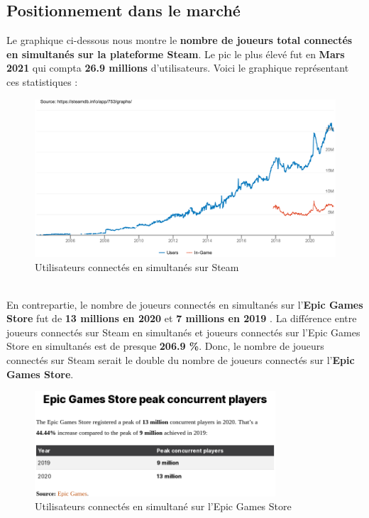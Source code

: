 \documentclass[12pt]{article}
\begin{document}
	\subsection{Positionnement dans le marché}
	Le graphique ci-dessous nous montre le \textbf{nombre de joueurs total connectés en simultanés sur la plateforme Steam}. Le pic le plus élevé fut en \textbf{Mars 2021} qui compta \textbf{26.9 millions} d'utilisateurs. Voici le graphique représentant ces statistiques \cite{steamdb_user_count}:
    \begin{figure}[ht]
		\centering
		\includegraphics[page=1, width=\textwidth, angle=0, clip, trim=0mm 0mm 0mm 10mm, scale=1.0]{chart.pdf}
		\caption{Utilisateurs connectés en simultanés sur Steam}
		\label{fig:diag_steam_players}
	\end{figure}\\
	En contrepartie, le nombre de joueurs connectés en simultanés sur l'\textbf{Epic Games Store} fut de \textbf{13 millions en 2020} et \textbf{7 millions en 2019} \cite{epicgames_user_count} \cite{backlink_epic_user_count}. La différence entre joueurs connectés sur Steam en simultanés et joueurs connectés sur l'Epic Games Store en simultanés est de presque \textbf{206.9 \%}. Donc, le nombre de joueurs connectés sur Steam serait le double du nombre de joueurs connectés sur l'\textbf{Epic Games Store}.
    \begin{figure}[ht]
        \centering
        \includegraphics[clip, trim=0mm 0mm 0mm 0mm, width=0.8\textwidth]{player_count_epic.png}
        \caption{Utilisateurs connectés en simultané sur l'Epic Games Store}
    \end{figure}
\end{document}
